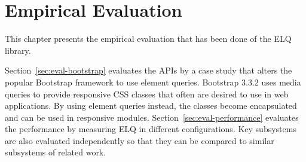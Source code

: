 \documentclass[a4paper,11pt]{kth-mag}
\begin{document}
  \chapter{Empirical Evaluation}\label{ch:eval}
    This chapter presents the empirical evaluation that has been done of the \gls{ELQ} library.

    Section~\ref{sec:eval-bootstrap} evaluates the \glspl{API} by a case study that alters the popular \gls{Bootstrap} framework to use element queries.
    \gls{Bootstrap} 3.3.2 uses \gls{media queries} to provide \gls{responsive} \gls{CSS} classes that often are desired to use in \gls{web} applications.
    By using element queries instead, the classes become \gls{encapsulated} and can be used in \gls{responsive} modules.
    Section~\ref{sec:eval-performance} evaluates the performance by measuring \gls{ELQ} in different configurations.
    Key subsystems are also evaluated independently so that they can be compared to similar subsystems of related work.

\end{document}
